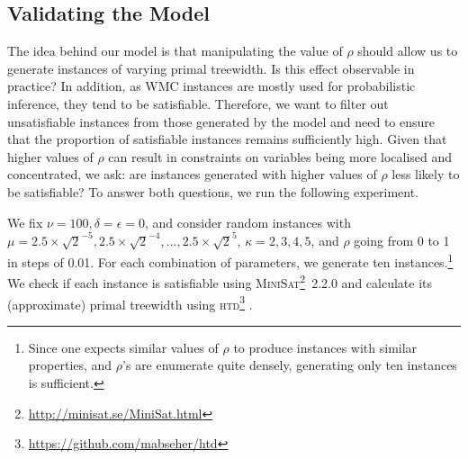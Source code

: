 



\subsection{Validating the Model}\label{sec:remarks}

The idea behind our model is that manipulating the value of $\rho$ should allow
us to generate instances of varying primal treewidth. Is this effect observable
in practice? In addition, as \textsf{WMC} instances are mostly used for
probabilistic inference, they tend to be satisfiable. Therefore, we want to
filter out unsatisfiable instances from those generated by the model and need to
ensure that the proportion of satisfiable instances remains sufficiently high.
Given that higher values of $\rho$ can result in constraints on variables being
more localised and concentrated, we ask: are instances generated with higher
values of $\rho$ less likely to be satisfiable? To answer both questions, we run
the following experiment.

\begin{experiment}\label{exp:regular_satisfiability}
  We fix $\nu = 100, \delta = \epsilon = 0$, and consider random instances with
  $\mu = 2.5 \times \sqrt{2}^{-5}, 2.5 \times \sqrt{2}^{-4}, \dots, 2.5 \times
  \sqrt{2}^5$, $\kappa = 2, 3, 4, 5$, and $\rho$ going from 0 to 1 in steps of
  0.01. For each combination of parameters, we generate ten instances.\footnote{Since one expects similar values of $\rho$ to produce instances with similar properties, and $\rho$'s are enumerate quite densely, generating only ten instances is sufficient.} We check if each instance is satisfiable using \textsc{MiniSat}\footnote{\url{http://minisat.se/MiniSat.html}}~2.2.0 \citep{DBLP:conf/sat/EenS03} and calculate its (approximate) primal treewidth using \textsc{htd}\footnote{\url{https://github.com/mabseher/htd}} \citep{DBLP:conf/cpaior/AbseherMW17}.
\end{experiment}

